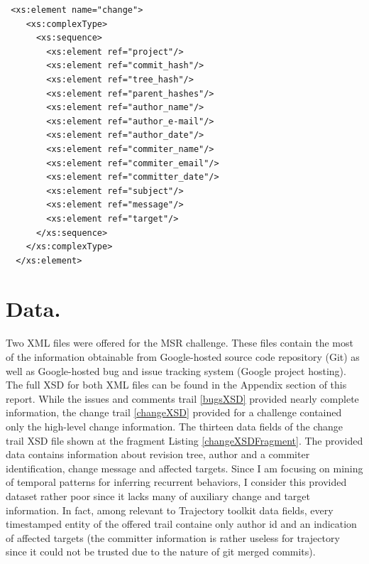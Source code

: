 \documentclass[a4paper,10pt]{article}
\numberwithin{equation}{subsection}
\begin{document}
\lstset{label=changeXSDFragment,caption=List of metadata provided by change trail XML (fragment) }
\begin{lstlisting}
 <xs:element name="change">
    <xs:complexType>
      <xs:sequence>
        <xs:element ref="project"/>
        <xs:element ref="commit_hash"/>
        <xs:element ref="tree_hash"/>
        <xs:element ref="parent_hashes"/>
        <xs:element ref="author_name"/>
        <xs:element ref="author_e-mail"/>
        <xs:element ref="author_date"/>
        <xs:element ref="commiter_name"/>
        <xs:element ref="commiter_email"/>
        <xs:element ref="committer_date"/>
        <xs:element ref="subject"/>
        <xs:element ref="message"/>
        <xs:element ref="target"/>
      </xs:sequence>
    </xs:complexType>
  </xs:element>
\end{lstlisting}

\section{Data.}
Two XML files were offered for the MSR challenge. These files contain the most of the information
obtainable from Google-hosted source code repository (Git) as well as Google-hosted bug and issue
tracking system (Google project hosting). 
The full XSD for both XML files can be found in the Appendix section of this report.
While the issues and comments trail \ref{bugsXSD} provided nearly complete information,
the change trail \ref{changeXSD} provided for a challenge contained only the high-level change information.
The thirteen data fields of the change trail XSD file shown at the fragment Listing \ref{changeXSDFragment}. 
The provided data contains information about revision tree, author and a commiter identification, change
message and affected targets.
Since I am focusing on mining of temporal patterns for inferring recurrent behaviors, I consider 
this provided dataset rather poor since it lacks many of auxiliary change and target information. 
In fact, among relevant to Trajectory toolkit data fields, every timestamped entity of the offered trail
containe only author id and an indication of affected targets (the committer information
is rather useless for trajectory since it could not be trusted due to the nature of git merged commits).   
\end{document}

